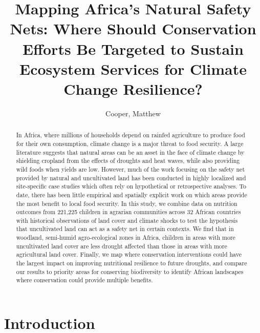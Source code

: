 \documentclass{article}
\begin{document}
\title{Mapping Africa's Natural Safety Nets: Where Should Conservation Efforts Be Targeted to Sustain Ecosystem Services for Climate Change Resilience?}

\author[1,2,*]{Cooper, Matthew}


\maketitle
\begin{abstract}

In Africa, where millions of households depend on rainfed agriculture to produce food for their own consumption, climate change is a major threat to food security.  A large literature suggests that natural areas can be an asset in the face of climate change by shielding cropland from the effects of droughts and heat waves, while also providing wild foods when yields are low.  However, much of the work focusing on the safety net provided by natural and uncultivated land has been conducted in highly localized and site-specific case studies which often rely on hypothetical or retrospective analyses.  To date, there has been little empirical and spatially explicit work on which areas provide the most benefit to local food security.  In this study, we combine data on nutrition outcomes from 221,225 children in agrarian communities across 32 African countries with historical observations of land cover and climate shocks to test the hypothesis that uncultivated land can act as a safety net in certain contexts.  We find that in woodland, semi-humid agro-ecological zones in Africa, children in areas with more uncultivated land cover are less drought affected than those in areas with more agricultural land cover.  Finally, we map where conservation interventions could have the largest impact on improving nutritional resilience to future droughts, and compare our results to priority areas for conserving biodiversity to identify African landscapes where conservation could provide multiple benefits.

\end{abstract}

\section{Introduction}
\end{document}
